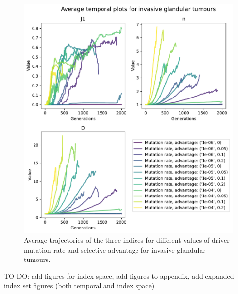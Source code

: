 \begin{figure}
    \centering
    \includegraphics[width=\textwidth]{Chapter_trajectories/figures/inv-gland-temporal.pdf}
    \caption{Average trajectories of the three indices for different values of driver mutation rate and selective advantage for invasive glandular tumours.}
    \label{fig:inv-gland-temporal}
\end{figure}
TO DO: add figures for index space, add figures to appendix, add expanded index set figures (both temporal and index space)
